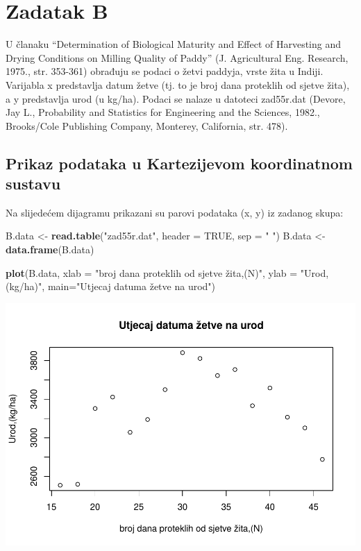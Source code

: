 \documentclass[]{article}
\newenvironment{Shaded}{\begin{snugshade}}{\end{snugshade}}
\newcommand{\KeywordTok}[1]{\textcolor[rgb]{0.13,0.29,0.53}{\textbf{{#1}}}}
\newcommand{\DataTypeTok}[1]{\textcolor[rgb]{0.13,0.29,0.53}{{#1}}}
\newcommand{\StringTok}[1]{\textcolor[rgb]{0.31,0.60,0.02}{{#1}}}
\newcommand{\OtherTok}[1]{\textcolor[rgb]{0.56,0.35,0.01}{{#1}}}
\newcommand{\NormalTok}[1]{{#1}}
\begin{document}
\section{Zadatak B}\label{zadatak-b}

U članaku ``Determination of Biological Maturity and Effect of
Harvesting and Drying Conditions on Milling Quality of Paddy'' (J.
Agricultural Eng. Research, 1975., str. 353-361) obrađuju se podaci o
žetvi paddyja, vrste žita u Indiji. Varijabla x predstavlja datum žetve
(tj. to je broj dana proteklih od sjetve žita), a y predstavlja urod (u
kg/ha). Podaci se nalaze u datoteci zad55r.dat (Devore, Jay L.,
Probability and Statistics for Engineering and the Sciences, 1982.,
Brooks/Cole Publishing Company, Monterey, California, str. 478).

\subsection{Prikaz podataka u Kartezijevom koordinatnom
sustavu}\label{prikaz-podataka-u-kartezijevom-koordinatnom-sustavu-1}

Na slijedećem dijagramu prikazani su parovi podataka (x, y) iz zadanog
skupa:

\begin{Shaded}
\begin{Highlighting}[]
\NormalTok{B.data <-}\StringTok{ }\KeywordTok{read.table}\NormalTok{(}\StringTok{"zad55r.dat"}\NormalTok{, }\DataTypeTok{header =} \OtherTok{TRUE}\NormalTok{, }\DataTypeTok{sep =} \StringTok{" "}\NormalTok{)}
\NormalTok{B.data <-}\StringTok{ }\KeywordTok{data.frame}\NormalTok{(B.data)}

\KeywordTok{plot}\NormalTok{(B.data, }\DataTypeTok{xlab =} \StringTok{"broj dana proteklih od sjetve žita,(N)"}\NormalTok{, }\DataTypeTok{ylab =} \StringTok{"Urod,(kg/ha)"}\NormalTok{, }\DataTypeTok{main=}\StringTok{"Utjecaj datuma žetve na urod"}\NormalTok{)}
\end{Highlighting}
\end{Shaded}

\includegraphics{Izvjestaj_files/figure-latex/unnamed-chunk-17-1.pdf}
\end{document}
